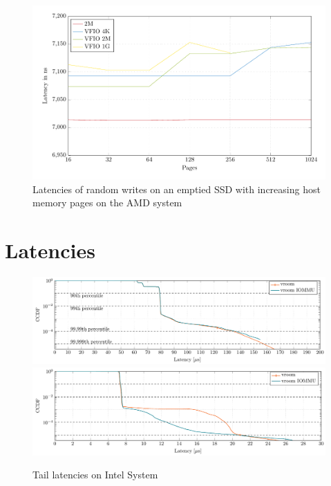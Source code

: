 \begin{figure}[H]
  \centering
  \includegraphics[width=\textwidth]{figures/psmedsepyc}
  \caption{Latencies of random writes on an emptied SSD with increasing host memory pages on the AMD system}
  \label{fig:med-psepyc}
\end{figure}

\section{Latencies}


\begin{figure}[H]
  \centering
   {\includegraphics[width=.99\textwidth]{figures/lats_ccdf_2MiB_qd1t1_read} \label{fig:ccdf-read}}
   {\includegraphics[width=.99\textwidth]{figures/lats_ccdf_2MiB_qd1t1} \label{fig:ccdf-write}}
  \caption{Tail latencies on Intel System}
  \label{fig:ccdf}
\end{figure}

